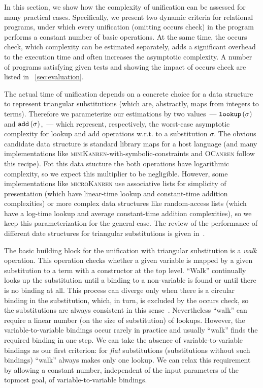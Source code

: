In this section, we show how the complexity of unification can be assessed for many practical cases. Specifically, we present two dynamic criteria
for relational programs, under which every unification (omitting occurs check) in the program performs a constant number of basic operations. At the same
time, the occurs check, which complexity can be estimated separately, adds a significant overhead to the execution time and often increases the asymptotic complexity.
A number of programs satisfying given tests and showing the impact of occurs check are listed in \sectionword~\ref{sec:evaluation}.

The actual time of unification depends on a concrete choice for a data structure to represent triangular substitutions (which are, abstractly, maps from integers to terms).
Therefore we parameterize our estimations by two values~--- $\texttt{lookup}\,(\sigma)$ and $\texttt{add}\,(\sigma)$,~--- which represent, respectively, the
worst-case asymptotic complexity for lookup and add operations w.r.t. to a substitution $\sigma$. The obvious candidate data structure is standard library maps
for a host language (and many implementations like \textsc{miniKanren}-with-symbolic-constraints and \textsc{OCanren} follow this recipe). 
Fot this data stucture the both operations have logarithmic complexity,
so we expect this multiplier to be negligible. However, some implementations like \textsc{microKanren} use associative lists for simplicity of presentation (which have linear-time
lookup and constant-time addition complexities) or more complex data structures like random-access lists (which have a log-time lookup and average constant-time addition complexities),
so we keep this parameterization for the general case. The review of the performance of different date structures for triangular substitutions is given in~\cite{SubstDataStructs}.

The basic building block for the unification with triangular substitution is a \emph{walk} operation. This operation checks whether a given variable is mapped by a given substitution to a
term with a constructor at the top level. ``Walk'' continually looks up the substitution until a binding to a non-variable is found or until there is no binding at all. This
process can diverge only when there is a circular binding in the substitution, which, in turn, is excluded by the occurs check, so the substitutions are always consistent
in this sense~\cite{NominalUnificationWithTriangularSubstitutions}. Nevertheless ``walk'' can require a linear number (on the size of substitution) of lookups.
However, the variable-to-variable bindings occur rarely in practice and usually ``walk'' finds the required binding in one step. We can take the absence of variable-to-variable bindings
as our first criterion: for \emph{flat} substitutions (substitutions without such bindings) ``walk'' always makes only one lookup. We can relax this requirement by allowing a
constant number, independent of the input parameters of the topmost goal, of variable-to-variable bindings.


